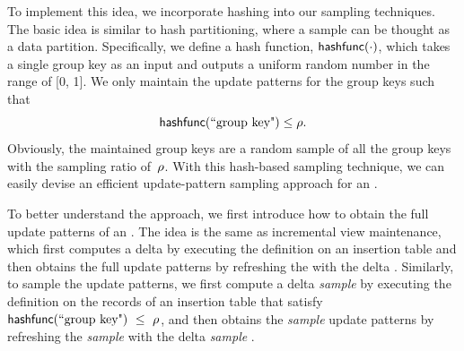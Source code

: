 To implement this idea, we incorporate hashing into our sampling techniques. The basic idea is similar to hash partitioning, where a sample can be thought as a data partition. Specifically, we define a hash function, $\textsf{hashfunc}(\cdot)$, which takes a single group key as an input and outputs a uniform random number in the range of [0, 1]. We only maintain the update patterns for the group keys such that
\begin{equation}\label{eq:hash}
\textsf{hashfunc}(\textrm{``group key"}) \leq \rho .
\end{equation}
Obviously, the maintained group keys are a random sample of all the group keys with the sampling ratio of~$\rho $.
With this hash-based sampling technique, we can easily devise an efficient update-pattern sampling approach for an \aggview. 


To better understand the approach, we first introduce how to obtain the full update patterns of an \aggview. The idea is the same as incremental view maintenance, which first computes a delta \aggview by executing the \aggview definition on an insertion table and then obtains the full update patterns by refreshing the \aggview with the delta \aggview. Similarly, to sample the update patterns, we first compute a delta \emph{sample} \aggview by executing the \aggview definition on the  records of an insertion table that satisfy $\textsf{hashfunc}(\textrm{``group key"})~\leq~\rho $, and then obtains the \emph{sample} update patterns by refreshing the \emph{sample} \aggview with the delta \emph{sample} \aggview. 




